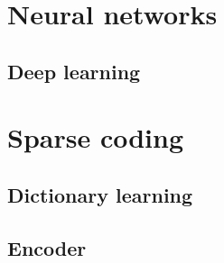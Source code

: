 \documentclass[a4paper,12pt,twoside]{report}
\begin{document}
\section{Neural networks}

\subsection{Deep learning}

\section{Sparse coding}

\subsection{Dictionary learning}

\subsection{Encoder}
\end{document}
